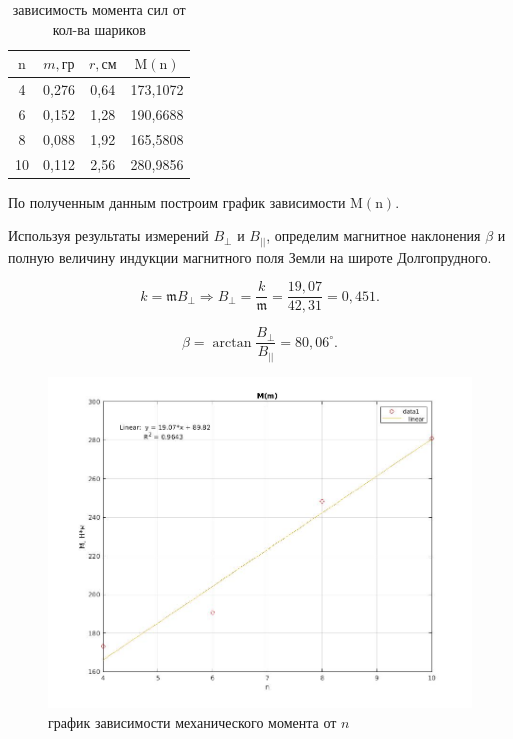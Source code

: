 \documentclass[a4paper, 12pt]{article}%
\begin{document}
\begin{table}[!h]
\begin{center}
\begin{tabular}{|c|c|c|c|}
\hline $\mathrm{n}$ & $m, \text{гр}$ & $r, \text{см}$ & $\mathrm{M}(\mathrm{n})$ \\
\hline 4 & 0,276 & 0,64 & 173,1072 \\
\hline 6 & 0,152 & 1,28 & 190,6688 \\
\hline 8 & 0,088 & 1,92 & 165,5808 \\
\hline 10 & 0,112 & 2,56 & 280,9856 \\
\hline
\end{tabular}
\caption{зависимость момента сил от кол-ва шариков}
\end{center}
\end{table}

По полученным данным построим график зависимости $\mathrm{M}(\mathrm{n})$.

Используя результаты измерений $B_{\perp}$ и $B_{||}$, определим магнитное наклонения $\beta$ и полную величину индукции магнитного поля Земли на широте Долгопрудного.

\[ k = \mathfrak{m} B_{\perp} \Rightarrow B_{\perp} = \frac{k}{\mathfrak{m}} = \frac{19,07}{42,31} = 0,451  .\]

\[ \beta = \arctan{\frac{B_{\perp}}{B_{||}}} = 80,06^{\circ} .\]

\newpage

\begin{figure}[h]
    \centering
    \includegraphics[width = 11 cm]{m(n)_big.jpg}
    \caption{график зависимости механического момента от $n$}
    \label{msh1}
\end{figure}
\end{document}
